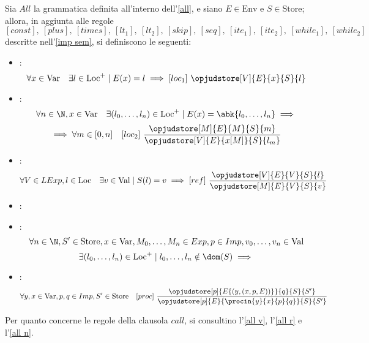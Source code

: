\documentclass[a4paper, 12pt]{report}
\begin{document}
    \begin{example}
        \label{all sem}
        Sia $All$ la grammatica definita all'interno dell'\cref{all}, e siano $E \in \mathrm{Env}$ e $S \in \mathrm{Store}$; allora, in aggiunta alle regole $$[const], \ [plus], \ [times], \ [lt_1], \ [lt_2], \ [skip], \ [seq], \ [ite_1], \ [ite_2], \ [while_1], \ [while_2]$$ descritte nell'\cref{imp sem}, si definiscono le seguenti:

        \begin{itemize}
            \item {}: $$\forall x \in \mathrm{Var} \quad \exists l \in \mathrm{Loc}^+ \mid E(x) = l \implies [loc_1] \ \opjudstore[V]{E}{x}{S}{l}$$
            \item {}: $$\forall n \in \N, x \in \mathrm{Var} \quad \exists (l_0, \ldots, l_n) \in \mathrm{Loc}^+ \mid E(x) = \abk{l_0, \ldots, l_n} \implies$$ $$\implies \forall m \in [0, n] \quad [loc_2] \ \dfrac{\opjudstore[M]{E}{M}{S}{m}}{\opjudstore[V]{E}{x[M]}{S}{l_m}}$$
            \item {}: $$\forall V \in LExp, l \in \mathrm{Loc} \quad \exists v \in \mathrm{Val} \mid S(l) = v \implies [ref] \ \dfrac{\opjudstore[V]{E}{V}{S}{l}}{\opjudstore[M]{E}{V}{S}{v}}$$
            \item {}: 
            \item {}: $$\forall n \in \N, S' \in \mathrm{Store}, x \in \mathrm{Var}, M_0, \ldots, M_n \in Exp, p \in Imp, v_0, \ldots, v_n \in \mathrm{Val}$$ $$\exists (l_0, \ldots, l_n) \in \mathrm{Loc}^+ \mid l_0, \ldots, l_n \notin \dom(S) \implies$$ 
            \item {}: $$\forall y,x \in \mathrm{Var}, p, q \in Imp, S' \in \mathrm{Store} \quad [proc] \ \dfrac{\opjudstore[p]{E\{(y,(x,p, E))\}}{q}{S}{S'}}{\opjudstore[p]{E}{\procin{y}{x}{p}{q}}{S}{S'}}$$
        \end{itemize}

        Per quanto concerne le regole della clausola $call$, si consultino l'\cref{all v}, l'\cref{all r} e l'\cref{all n}.
    \end{example}
\end{document}
